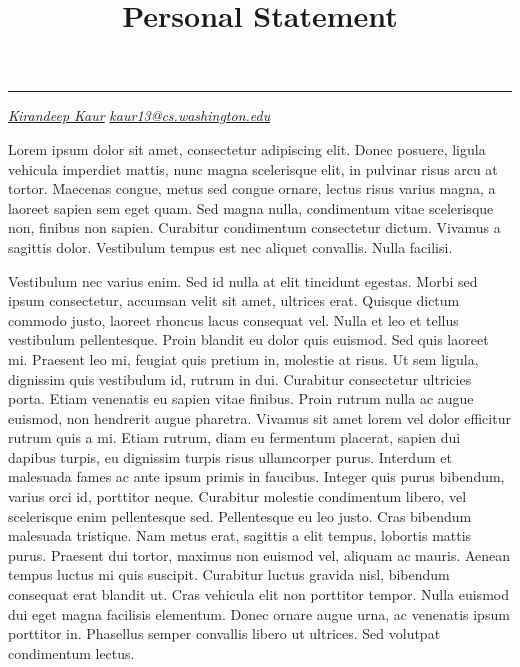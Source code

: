 \documentclass[12pt, a4paper]{article}
\title{Personal Statement}
\makeatletter
\newcommand{\authorname}{Kirandeep Kaur}
\newcommand{\authoremail}{kaur13@cs.washington.edu}
\renewcommand{\maketitle}{
  \begin{center}
    {\color{headingcolor} \Huge \scshape \@title}
    \par\noindent\rule{\textwidth}{0.5mm}
    {\normalsize \color{headingcolor} \emph{\href{https://i-kiran.github.io/}{\authorname}} \hfill \emph{\href{mailto:\authoremail}{\authoremail}}}
  \end{center}
}
\makeatother
\begin{document}
\maketitle

Lorem ipsum dolor sit amet, consectetur adipiscing elit. Donec posuere, ligula vehicula imperdiet mattis, nunc magna scelerisque elit, in pulvinar risus arcu at tortor. Maecenas congue, metus sed congue ornare, lectus risus varius magna, a laoreet sapien sem eget quam. Sed magna nulla, condimentum vitae scelerisque non, finibus non sapien. Curabitur condimentum consectetur dictum. Vivamus a sagittis dolor. Vestibulum tempus est nec aliquet convallis. Nulla facilisi.


Vestibulum nec varius enim. Sed id nulla at elit tincidunt egestas. Morbi sed ipsum consectetur, accumsan velit sit amet, ultrices erat. Quisque dictum commodo justo, laoreet rhoncus lacus consequat vel. Nulla et leo et tellus vestibulum pellentesque. Proin blandit eu dolor quis euismod. Sed quis laoreet mi. Praesent leo mi, feugiat quis pretium in, molestie at risus. Ut sem ligula, dignissim quis vestibulum id, rutrum in dui. Curabitur consectetur ultricies porta. Etiam venenatis eu sapien vitae finibus. Proin rutrum nulla ac augue euismod, non hendrerit augue pharetra. Vivamus sit amet lorem vel dolor efficitur rutrum quis a mi. Etiam rutrum, diam eu fermentum placerat, sapien dui dapibus turpis, eu dignissim turpis risus ullamcorper purus. Interdum et malesuada fames ac ante ipsum primis in faucibus. Integer quis purus bibendum, varius orci id, porttitor neque. Curabitur molestie condimentum libero, vel scelerisque enim pellentesque sed. Pellentesque eu leo justo. Cras bibendum malesuada tristique. Nam metus erat, sagittis a elit tempus, lobortis mattis purus. Praesent dui tortor, maximus non euismod vel, aliquam ac mauris. Aenean tempus luctus mi quis suscipit. Curabitur luctus gravida nisl, bibendum consequat erat blandit ut. Cras vehicula elit non porttitor tempor. Nulla euismod dui eget magna facilisis elementum. Donec ornare augue urna, ac venenatis ipsum porttitor in. Phasellus semper convallis libero ut ultrices. Sed volutpat condimentum lectus.




\end{document}
